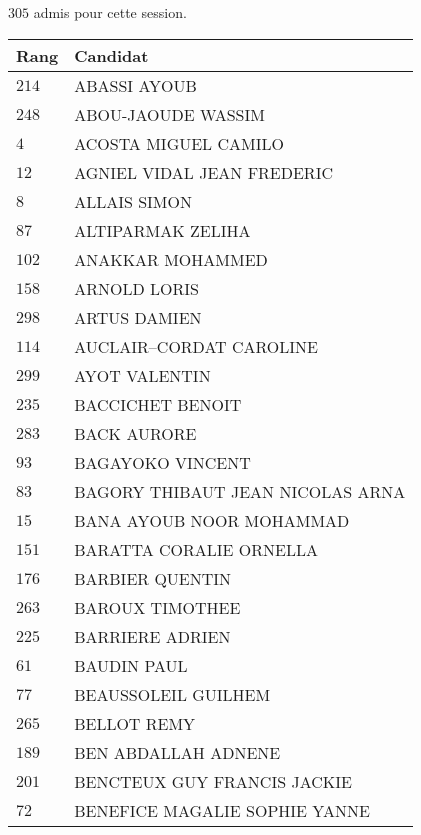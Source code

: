 




  $305$ admis pour cette session.

  \begin{xltabular}{\linewidth}{|l|X|}
    \hline
    \textbf{Rang} & \textbf{Candidat} \\
    \hline
    $214$ & ABASSI AYOUB \\
    \hline
    $248$ & ABOU-JAOUDE WASSIM \\
    \hline
    $4$ & ACOSTA MIGUEL CAMILO \\
    \hline
    $12$ & AGNIEL VIDAL JEAN FREDERIC \\
    \hline
    $8$ & ALLAIS SIMON \\
    \hline
    $87$ & ALTIPARMAK ZELIHA \\
    \hline
    $102$ & ANAKKAR MOHAMMED \\
    \hline
    $158$ & ARNOLD LORIS \\
    \hline
    $298$ & ARTUS DAMIEN \\
    \hline
    $114$ & AUCLAIR--CORDAT CAROLINE \\
    \hline
    $299$ & AYOT VALENTIN \\
    \hline
    $235$ & BACCICHET BENOIT \\
    \hline
    $283$ & BACK AURORE \\
    \hline
    $93$ & BAGAYOKO VINCENT \\
    \hline
    $83$ & BAGORY THIBAUT JEAN NICOLAS ARNA \\
    \hline
    $15$ & BANA AYOUB NOOR MOHAMMAD \\
    \hline
    $151$ & BARATTA CORALIE ORNELLA \\
    \hline
    $176$ & BARBIER QUENTIN \\
    \hline
    $263$ & BAROUX TIMOTHEE \\
    \hline
    $225$ & BARRIERE ADRIEN \\
    \hline
    $61$ & BAUDIN PAUL \\
    \hline
    $77$ & BEAUSSOLEIL GUILHEM \\
    \hline
    $265$ & BELLOT REMY \\
    \hline
    $189$ & BEN ABDALLAH ADNENE \\
    \hline
    $201$ & BENCTEUX GUY FRANCIS JACKIE \\
    \hline
    $72$ & BENEFICE MAGALIE SOPHIE YANNE \\
    \hline

\end{xltabular}
